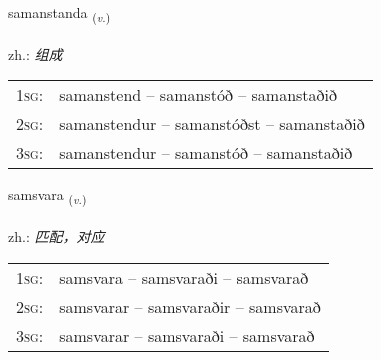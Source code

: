 \documentclass[frontgrid, backgrid]{flacards}\usepackage[]{graphicx}\usepackage[]{xcolor}
\begin{document}
\renewcommand{\blhead}{\vskip5pt {\small\bfseries\footnotesize Sagnorð | 动词 }}
\renewcommand{\bcfoot}{\vskip5pt \hspace{2pt}{\small\bfseries\footnotesize 3K}}


{samanstanda \small{\textsubscript{(\textit{v.})}} \\[1ex] %
\textphonetic{[saːmanstanta]} \\
zh.: \emph{组成} \\  [2ex]
\renewcommand*{\arraystretch}{0.8}
\begin{tabular}{p{1cm}l}
\textsc{1sg}: & samanstend -- samanstóð -- samanstaðið \\ 
\textsc{2sg}: & samanstendur -- samanstóðst -- samanstaðið \\ 
\textsc{3sg}: & samanstendur -- samanstóð -- samanstaðið \\ 
\end{tabular}
}

\renewcommand{\flhead}{\vskip5pt \fboxsep=0pt {\small\bfseries\footnotesize Sagnorð | 动词}}
\renewcommand{\fcfoot}{\vskip5pt \fboxsep=0pt \hspace{2pt}{\small\bfseries\footnotesize 3K}}

\renewcommand{\blhead}{\vskip5pt {\small\bfseries\footnotesize Sagnorð | 动词 }}
\renewcommand{\bcfoot}{\vskip5pt \hspace{2pt}{\small\bfseries\footnotesize 3K}}


{samsvara \small{\textsubscript{(\textit{v.})}} \\[1ex] %
\textphonetic{[samsvara]} \\
zh.: \emph{匹配，对应} \\  [2ex]
\renewcommand*{\arraystretch}{0.8}
\begin{tabular}{p{1cm}l}
\textsc{1sg}: & samsvara -- samsvaraði -- samsvarað \\ 
\textsc{2sg}: & samsvarar -- samsvaraðir -- samsvarað \\ 
\textsc{3sg}: & samsvarar -- samsvaraði -- samsvarað \\ 
\end{tabular}
}
\end{document}
